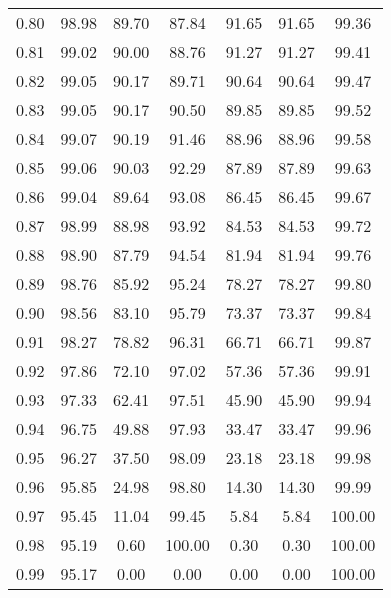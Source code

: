 \begin{tabular}{|c|c|c|c|c|c|c|}
      0.80 &     98.98 &     89.70 &      87.84 &   91.65 &      91.65 &         99.36 \\
      0.81 &     99.02 &     90.00 &      88.76 &   91.27 &      91.27 &         99.41 \\
      0.82 &     99.05 &     90.17 &      89.71 &   90.64 &      90.64 &         99.47 \\
      0.83 &     99.05 &     90.17 &      90.50 &   89.85 &      89.85 &         99.52 \\
      0.84 &     99.07 &     90.19 &      91.46 &   88.96 &      88.96 &         99.58 \\
      0.85 &     99.06 &     90.03 &      92.29 &   87.89 &      87.89 &         99.63 \\
      0.86 &     99.04 &     89.64 &      93.08 &   86.45 &      86.45 &         99.67 \\
      0.87 &     98.99 &     88.98 &      93.92 &   84.53 &      84.53 &         99.72 \\
      0.88 &     98.90 &     87.79 &      94.54 &   81.94 &      81.94 &         99.76 \\
      0.89 &     98.76 &     85.92 &      95.24 &   78.27 &      78.27 &         99.80 \\
      0.90 &     98.56 &     83.10 &      95.79 &   73.37 &      73.37 &         99.84 \\
      0.91 &     98.27 &     78.82 &      96.31 &   66.71 &      66.71 &         99.87 \\
      0.92 &     97.86 &     72.10 &      97.02 &   57.36 &      57.36 &         99.91 \\
      0.93 &     97.33 &     62.41 &      97.51 &   45.90 &      45.90 &         99.94 \\
      0.94 &     96.75 &     49.88 &      97.93 &   33.47 &      33.47 &         99.96 \\
      0.95 &     96.27 &     37.50 &      98.09 &   23.18 &      23.18 &         99.98 \\
      0.96 &     95.85 &     24.98 &      98.80 &   14.30 &      14.30 &         99.99 \\
      0.97 &     95.45 &     11.04 &      99.45 &    5.84 &       5.84 &        100.00 \\
      0.98 &     95.19 &      0.60 &     100.00 &    0.30 &       0.30 &        100.00 \\
      0.99 &     95.17 &      0.00 &       0.00 &    0.00 &       0.00 &        100.00 \\
\bottomrule
\end{tabular}

